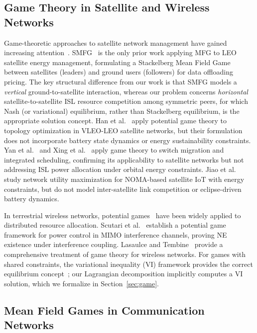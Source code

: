 \documentclass[journal]{IEEEtran}
\begin{document}
\subsection{Game Theory in Satellite and
Wireless Networks}

Game-theoretic approaches to satellite network management have gained increasing attention~\cite{jiang2024gametheory}. SMFG~\cite{wang2023smfg} is the only prior work applying MFG to LEO satellite energy management, formulating a Stackelberg Mean Field Game between satellites (leaders) and ground users (followers) for data offloading pricing. The key structural difference from our work is that SMFG models a \emph{vertical} ground-to-satellite interaction, whereas our problem concerns
\emph{horizontal} satellite-to-satellite ISL
resource competition among symmetric peers, for which Nash (or variational) equilibrium, rather than Stackelberg equilibrium, is the appropriate solution concept. Han et al.~\cite{han2024topology} apply potential game theory to topology optimization in VLEO-LEO satellite networks, but their formulation does not incorporate battery state dynamics or energy sustainability constraints. Yan et al.~\cite{yan2024switchmigration} and Xing et al.~\cite{xing2026matching} apply game theory to switch migration and integrated scheduling, confirming its applicability to satellite networks but not addressing ISL power allocation under orbital energy constraints. Jiao et al.~\cite{jiao2020noma} study network utility maximization for NOMA-based satellite IoT with energy constraints, but do not model inter-satellite link competition or eclipse-driven battery dynamics.

In terrestrial wireless networks, potential games~\cite{monderer1996potential} have been widely applied to distributed resource allocation. Scutari et al.~\cite{scutari2008mimo} establish a potential game framework for power control in MIMO interference channels, proving NE existence under interference coupling. Lasaulce and Tembine~\cite{lasaulce2011gametheory} provide a comprehensive treatment of game theory for wireless networks. For games with shared constraints, the variational inequality (VI) framework provides the correct equilibrium concept~\cite{facchinei2007vi}; our Lagrangian decomposition implicitly computes a VI solution, which we formalize in Section~\ref{sec:game}.

\subsection{Mean Field Games in Communication Networks}
\end{document}

